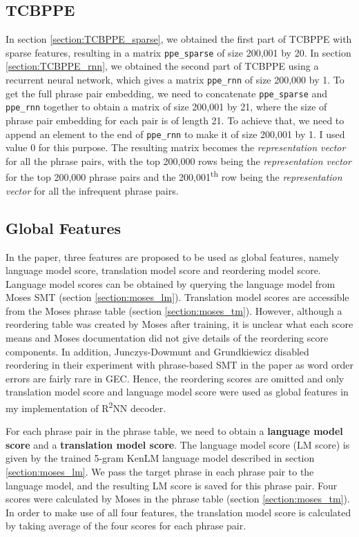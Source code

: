 \documentclass[12pt,a4paper,twoside,openright]{report}
\begin{document}
\subsection{TCBPPE}\label{section:TCBPPE}
In section \ref{section:TCBPPE_sparse}, we obtained the first part of TCBPPE with sparse features, resulting in a matrix \texttt{ppe\_sparse} of size 200,001 by 20. In section \ref{section:TCBPPE_rnn}, we obtained the second part of TCBPPE using a recurrent neural network, which gives a matrix \texttt{ppe\_rnn} of size 200,000 by 1. To get the full phrase pair embedding, we need to concatenate \texttt{ppe\_sparse} and \texttt{ppe\_rnn} together to obtain a matrix of size 200,001 by 21, where the size of phrase pair embedding for each pair is of length 21. To achieve that, we need to append an element to the end of \texttt{ppe\_rnn} to make it of size 200,001 by 1. I used value 0 for this purpose. The resulting matrix becomes the \textit{representation vector} for all the phrase pairs, with the top 200,000 rows being the \textit{representation vector} for the top 200,000 phrase pairs and the 200,001\textsuperscript{th} row being the \textit{representation vector} for all the infrequent phrase pairs.

\subsection{Global Features} \label{section:global_features}
In the paper\cite{r2nn}, three features are proposed to be used as global features, namely language model score, translation model score and reordering model score. Language model scores can be obtained by querying the language model from Moses SMT (section \ref{section:moses_lm}). Translation model scores are accessible from the Moses phrase table (section \ref{section:moses_tm}). However, although a reordering table was created by Moses after training, it is unclear what each score means and Moses documentation did not give details of the reordering score components. In addition, Junczys-Dowmunt and Grundkiewicz disabled reordering in their experiment with phrase-based SMT in the paper\cite{junczys-dowmunt-grundkiewicz-2016-phrase} as word order errors are fairly rare in GEC. Hence, the reordering scores are omitted and only translation model score and language model score were used as global features in my implementation of R\textsuperscript{2}NN decoder.

For each phrase pair in the phrase table, we need to obtain a \textbf{language model score} and a \textbf{translation model score}. The language model score (LM score) is given by the trained 5-gram KenLM language model described in section \ref{section:moses_lm}. We pass the target phrase in each phrase pair to the language model, and the resulting LM score is saved for this phrase pair. Four scores were calculated by Moses in the phrase table (section \ref{section:moses_tm}). In order to make use of all four features, the translation model score is calculated by taking average of the four scores for each phrase pair.
\end{document}
